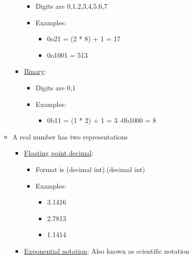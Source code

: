 \documentclass[11pt]{article}
\providecommand{\tightlist}{%
      \setlength{\itemsep}{0pt}\setlength{\parskip}{0pt}}
\begin{document}
\begin{itemize}
\begin{itemize}
\begin{itemize}
      \begin{itemize}
      \tightlist
      \item
        Digits are 0,1,2,3,4,5,6,7
      \item
        Examples:

        \begin{itemize}
        \tightlist
        \item
          0o21 = (2 * 8) + 1 = 17
        \item
          0o1001 = 513
        \end{itemize}
      \end{itemize}
    \item
      \href{https://en.wikipedia.org/wiki/Binary_number}{Binary}:

      \begin{itemize}
      \tightlist
      \item
        Digits are 0,1
      \item
        Examples:

        \begin{itemize}
        \tightlist
        \item
          0b11 = (1 * 2) + 1 = 3 -0b1000 = 8
        \end{itemize}
      \end{itemize}
    \end{itemize}
  \item
    A real number has two representations

    \begin{itemize}
    \tightlist
    \item
      \href{https://en.wikipedia.org/wiki/Decimal_floating_point}{Floating
      point decimal}:

      \begin{itemize}
      \tightlist
      \item
        Format is (decimal int).(decimal int)
      \item
        Examples:

        \begin{itemize}
        \tightlist
        \item
          3.1416
        \item
          2.7813
        \item
          1.1414
        \end{itemize}
      \end{itemize}
    \item
      \href{https://en.wikipedia.org/wiki/Scientific_notation}{Exponential
      notation}: Also known as scientific notation


\end{itemize}
\end{itemize}
\end{itemize}
\end{document}
